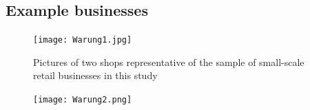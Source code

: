 \documentclass[11.5pt]{article}
\begin{document}
\begin{appendices}
\pagebreak




\section{Example businesses}\label{sec:expbusinesses}

\begin{figure}[h!]
\centering
\caption{Pictures of two shops representative of the sample of small-scale retail businesses in this study}
\label{warung1}
    \texttt{[image: Warung1.jpg]}
\end{figure}

\begin{figure}[h!]
\centering
\label{warung2}
    \texttt{[image: Warung2.png]}
\end{figure}

\end{appendices}
\end{document}
